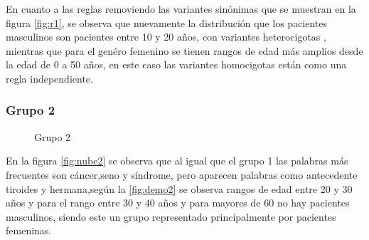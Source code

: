 En cuanto a las reglas removiendo las variantes sinónimas que se muestran en la figura  \ref{fig:r1}, se observa que  nuevamente la distribución que los pacientes masculinos son pacientes entre 10 y 20 años, con variantes heterocigotas , mientras que para el genéro femenino se tienen rangos de edad más amplios desde la edad  de 0 a 50 años, en este caso las variantes homocigotas están como una regla independiente.\\

\subsubsection*{Grupo 2}

\begin{figure}[H]
	\centering
	\caption{Grupo 2} \label{fig:c2}
\end{figure}

En la figura \ref{fig:nube2} se observa que al igual que el grupo 1 las palabras más frecuentes son cáncer,seno y síndrome, pero aparecen palabras como antecedente tiroides y hermana,según la \ref{fig:demo2} se observa rangos de edad entre 20 y 30 años y para el rango entre 30 y 40 años y para mayores de 60 no hay pacientes masculinos, siendo este un grupo representado principalmente por pacientes femeninas.  

